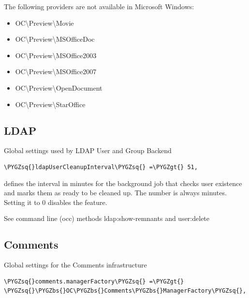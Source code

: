 \documentclass[letterpaper,10pt,english]{sphinxmanual}
\def\PYGZbs{\char`\\}
\def\PYGZgt{\char`\>}
\def\PYGZsq{\char`\'}
\renewcommand\PYGZsq{\textquotesingle}
\begin{document}
The following providers are not available in Microsoft Windows:
\begin{itemize}
\item {} 
OC\textbackslash{}Preview\textbackslash{}Movie

\item {} 
OC\textbackslash{}Preview\textbackslash{}MSOfficeDoc

\item {} 
OC\textbackslash{}Preview\textbackslash{}MSOffice2003

\item {} 
OC\textbackslash{}Preview\textbackslash{}MSOffice2007

\item {} 
OC\textbackslash{}Preview\textbackslash{}OpenDocument

\item {} 
OC\textbackslash{}Preview\textbackslash{}StarOffice

\end{itemize}


\subsection{LDAP}
\label{configuration_server/config_sample_php_parameters:ldap}
Global settings used by LDAP User and Group Backend

\begin{Verbatim}[commandchars=\\\{\}]
\PYGZsq{}ldapUserCleanupInterval\PYGZsq{} =\PYGZgt{} 51,
\end{Verbatim}

defines the interval in minutes for the background job that checks user
existence and marks them as ready to be cleaned up. The number is always
minutes. Setting it to 0 disables the feature.

See command line (occ) methods ldap:show-remnants and user:delete


\subsection{Comments}
\label{configuration_server/config_sample_php_parameters:comments}
Global settings for the Comments infrastructure

\begin{Verbatim}[commandchars=\\\{\}]
\PYGZsq{}comments.managerFactory\PYGZsq{} =\PYGZgt{} \PYGZsq{}\PYGZbs{}OC\PYGZbs{}Comments\PYGZbs{}ManagerFactory\PYGZsq{},
\end{Verbatim}
\end{document}
